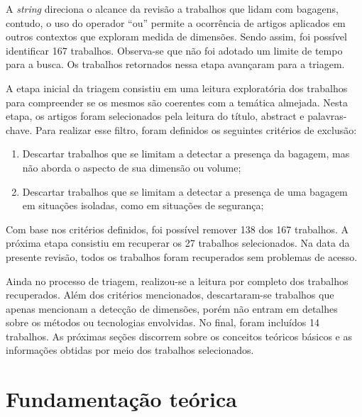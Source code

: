     A \textit{string} direciona o alcance da revisão a trabalhos que lidam com bagagens, contudo, o uso do operador “ou” permite a ocorrência de artigos aplicados em outros contextos que exploram medida de dimensões. Sendo assim, foi possível identificar 167 trabalhos. Observa-se que não foi adotado um limite de tempo para a busca. Os trabalhos retornados nessa etapa avançaram para a triagem.



    A etapa inicial da triagem consistiu em uma leitura exploratória dos trabalhos para compreender se os mesmos são coerentes com a temática almejada. Nesta etapa, os artigos foram selecionados pela leitura do título, abstract e palavras-chave. Para realizar esse filtro, foram definidos os seguintes critérios de exclusão:

    \begin{enumerate}
        \item Descartar trabalhos que se limitam a detectar a presença da bagagem, mas não aborda o aspecto de sua dimensão ou volume;
        \item Descartar trabalhos que se limitam a detectar a presença de uma bagagem em situações isoladas, como em situações de segurança;
    \end{enumerate}

    Com base nos critérios definidos, foi possível remover 138 dos 167 trabalhos. A próxima etapa consistiu em recuperar os 27 trabalhos selecionados. Na data da presente revisão, todos os trabalhos foram recuperados sem problemas de acesso. 

    Ainda no processo de triagem, realizou-se a leitura por completo dos trabalhos recuperados. Além dos critérios mencionados, descartaram-se trabalhos que apenas mencionam a detecção de dimensões, porém não entram em detalhes sobre os métodos ou tecnologias envolvidas. No final, foram incluídos 14 trabalhos. As próximas seções discorrem sobre os conceitos teóricos básicos e as informações obtidas por meio dos trabalhos selecionados.

\section{Fundamentação teórica}
\label{sec_Fundamentacao_teorica}

